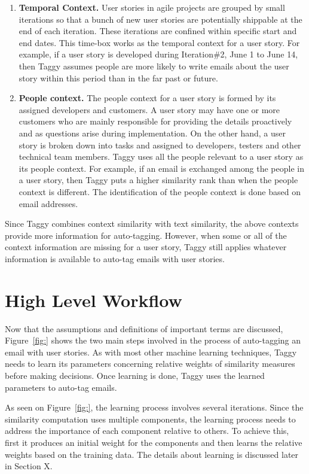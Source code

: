 \begin{enumerate}
	\item \textbf{Temporal Context.} User stories in agile projects are grouped by small iterations so that a bunch of new user stories are potentially shippable at the end of each iteration. These iterations are confined within specific start and end dates. This time-box works as the temporal context for a user story. For example, if a user story is developed during Iteration\#2, June 1 to June 14, then Taggy assumes people are more likely to write emails about the user story within this period than in the far past or future.
	
	\item \textbf{People context.} The people context for a user story is formed by its assigned developers and customers. A user story may have one or more customers who are mainly responsible for providing the details proactively and as questions arise during implementation. On the other hand, a user story is broken down into tasks and assigned to developers, testers and other technical team members. Taggy uses all the people relevant to a user story as its people context. For example, if an email is exchanged among the people in a user story, then Taggy puts a higher similarity rank than when the people context is different. The identification of the people context is done based on email addresses.
\end{enumerate}

Since Taggy combines context similarity with text similarity, the above contexts provide more information for auto-tagging. However, when some or all of the context information are missing for a user story, Taggy still applies whatever information is available to auto-tag emails with user stories.

\section{High Level Workflow}
Now that the assumptions and definitions of important terms are discussed, Figure~\ref{fig:} shows the two main steps involved in the process of auto-tagging an email with user stories. As with most other machine learning techniques, Taggy needs to learn its parameters concerning relative weights of similarity measures before making decisions. Once learning is done, Taggy uses the learned parameters to auto-tag emails.

As seen on Figure~\ref{fig:}, the learning process involves several iterations. Since the similarity computation uses multiple components, the learning process needs to address the importance of each component relative to others. To achieve this, first it produces an initial weight for the components and then learns the relative weights based on the training data. The details about learning is discussed later in Section X.


